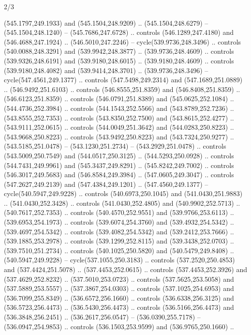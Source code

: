 \begin{flagdescription}{2/3}
\begin{scope}[xshift=0.5\flaglength,yshift=0.5\flagwidth,scale=\flagwidth/495.65]
\begin{scope}[y=0.8pt, x=0.8pt, yscale=-1,shift={(-463.76,-309.78)}]
  (545.1797,249.1933) and (545.1504,248.9209) .. (545.1504,248.6279) --
  (545.1504,248.1240) -- (545.7686,247.6728) .. controls (546.1289,247.4180) and
  (546.4688,247.1924) .. (546.5010,247.2246) -- cycle(539.9736,248.3496) ..
  controls (540.0088,248.3291) and (539.9942,248.3877) .. (539.9736,248.4609) ..
  controls (539.9326,248.6191) and (539.9180,248.6015) .. (539.9180,248.4609) ..
  controls (539.9180,248.4082) and (539.9414,248.3701) .. (539.9736,248.3496) --
  cycle(547.4561,249.1377) .. controls (547.5498,249.2314) and
  (547.1689,251.0889) .. (546.9492,251.6103) .. controls (546.8555,251.8359) and
  (546.8408,251.8359) .. (546.6123,251.8359) .. controls (546.0791,251.8389) and
  (545.0625,252.1084) .. (544.4736,252.3984) .. controls (544.1543,252.5566) and
  (543.8789,252.7236) .. (543.8555,252.7353) .. controls (543.8350,252.7500) and
  (543.8615,252.4277) .. (543.9111,252.0615) .. controls (544.0049,251.3642) and
  (544.0283,250.8223) .. (543.9668,250.8223) .. controls (543.9492,250.8223) and
  (543.7324,250.9277) .. (543.5185,251.0478) -- (543.1230,251.2734) --
  (543.2929,251.0478) .. controls (543.5009,250.7549) and (544.0517,250.3125) ..
  (544.5293,250.0928) .. controls (544.7431,249.9961) and (545.3437,249.8291) ..
  (545.8242,249.7002) .. controls (546.3017,249.5683) and (546.8584,249.3984) ..
  (547.0605,249.3047) .. controls (547.2627,249.2139) and (547.4384,249.1201) ..
  (547.4560,249.1377) -- cycle(540.5947,249.9228) .. controls
  (540.6973,250.1045) and (541.0430,251.9883) .. (541.0430,252.3428) .. controls
  (541.0430,252.4805) and (540.9902,252.5713) .. (540.7617,252.7353) .. controls
  (540.4570,252.9551) and (539.9766,253.6113) .. (539.6953,254.1973) .. controls
  (539.6074,254.3760) and (539.4932,254.5342) .. (539.4697,254.5342) .. controls
  (539.4082,254.5342) and (539.2412,253.7666) .. (539.1885,253.2978) .. controls
  (539.1299,252.8115) and (539.3438,252.0703) .. (539.7510,251.2734) .. controls
  (540.1025,250.5820) and (540.5479,249.8408) .. (540.5947,249.9228) --
  cycle(537.1055,250.3183) .. controls (537.2520,250.4853) and
  (537.4424,251.5078) .. (537.4453,252.0615) .. controls (537.4453,252.3926) and
  (537.4629,252.8232) .. (537.5010,253.0723) .. controls (537.5625,253.5058) and
  (537.5889,253.5557) .. (537.3867,254.0303) .. controls (537.1025,254.6953) and
  (536.7099,255.8349) .. (536.6572,256.1660) .. controls (536.6338,256.3125) and
  (536.5723,256.4473) .. (536.5430,256.4473) .. controls (536.5166,256.4473) and
  (536.3848,256.2451) .. (536.2617,256.0547) -- (536.0390,255.7178) --
  (536.0947,254.9853) .. controls (536.1503,253.9599) and (536.9765,250.1660) ..

\end{scope}
\end{scope}
\end{flagdescription}

